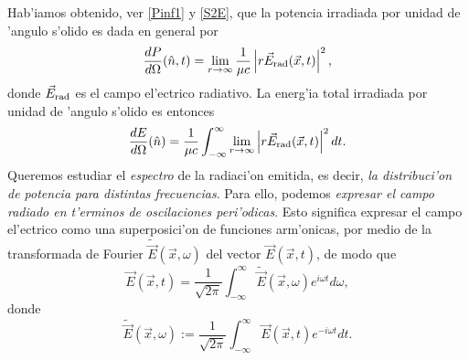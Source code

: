 Hab'iamos obtenido, ver \eqref{Pinf1} y \eqref{S2E}, que la potencia irradiada por unidad de 'angulo s'olido es dada en general por
\begin{equation}\label{dp1}
\frac{dP}{d\Omega}(\hat{n},t)=\lim_{r\to\infty}\frac{1}{\mu c}\left|r\vec{E}_{\rm{rad}}(\vec{x},t)\right|^2 , %
\end{equation}
donde $\vec{E}_{\rm{rad}}$ es el campo el'ectrico radiativo.
%
La energ'ia total irradiada por unidad de 'angulo s'olido es entonces
\begin{equation}
\frac{dE}{d\Omega}(\hat{n}) =\frac{1}{\mu c}\int_{-\infty}^{\infty}\lim_{r\to\infty}\left|r\vec{E}_{\rm{rad}}(\vec{x},t)\right|^2 dt .
\end{equation}
Queremos estudiar el \textit{espectro} de la radiaci'on emitida, es decir, \textit{la distribuci'on de potencia para distintas frecuencias}. Para ello, podemos \textit{expresar el campo radiado en t'erminos de oscilaciones peri'odicas}. Esto significa expresar el campo el'ectrico como una superposici'on de funciones arm'onicas, por medio de la transformada de Fourier $\tilde{\vec{E}}(\vec{x},\omega)$ del vector $\vec{E}(\vec{x},t)$, de modo que
\begin{equation}
 \vec{E}(\vec{x},t)=\frac{1}{\sqrt{2\pi}}\int_{-\infty}^{\infty}\tilde{\vec{E}}
(\vec{x},\omega) e^{i\omega t}d\omega ,
\end{equation}
donde
\begin{equation}
\tilde{\vec{E}}(\vec{x},\omega) :=\frac{1}{\sqrt{2\pi}}\int_{-\infty}^{\infty}\vec{E}(\vec{x},t) e^{-i\omega t}dt .  \label{dp3}
\end{equation}

